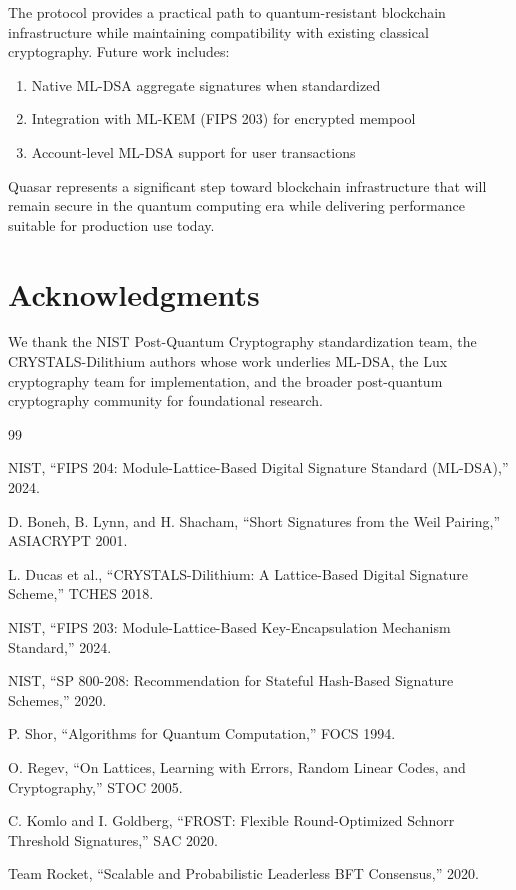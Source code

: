 \documentclass[11pt,a4paper]{article}
\begin{document}
The protocol provides a practical path to quantum-resistant blockchain infrastructure while maintaining compatibility with existing classical cryptography. Future work includes:

\begin{enumerate}
    \item Native ML-DSA aggregate signatures when standardized
    \item Integration with ML-KEM (FIPS 203) for encrypted mempool
    \item Account-level ML-DSA support for user transactions
\end{enumerate}

Quasar represents a significant step toward blockchain infrastructure that will remain secure in the quantum computing era while delivering performance suitable for production use today.

\section*{Acknowledgments}

We thank the NIST Post-Quantum Cryptography standardization team, the CRYSTALS-Dilithium authors whose work underlies ML-DSA, the Lux cryptography team for implementation, and the broader post-quantum cryptography community for foundational research.

\begin{thebibliography}{99}

NIST, ``FIPS 204: Module-Lattice-Based Digital Signature Standard (ML-DSA),'' 2024.

D. Boneh, B. Lynn, and H. Shacham, ``Short Signatures from the Weil Pairing,'' ASIACRYPT 2001.

L. Ducas et al., ``CRYSTALS-Dilithium: A Lattice-Based Digital Signature Scheme,'' TCHES 2018.

NIST, ``FIPS 203: Module-Lattice-Based Key-Encapsulation Mechanism Standard,'' 2024.

NIST, ``SP 800-208: Recommendation for Stateful Hash-Based Signature Schemes,'' 2020.

P. Shor, ``Algorithms for Quantum Computation,'' FOCS 1994.

O. Regev, ``On Lattices, Learning with Errors, Random Linear Codes, and Cryptography,'' STOC 2005.

C. Komlo and I. Goldberg, ``FROST: Flexible Round-Optimized Schnorr Threshold Signatures,'' SAC 2020.

Team Rocket, ``Scalable and Probabilistic Leaderless BFT Consensus,'' 2020.

\end{thebibliography}
\end{document}
